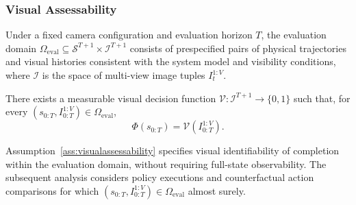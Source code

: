 \subsubsection{Visual Assessability}
Under a fixed camera configuration and evaluation horizon $T$, the evaluation domain
$\Omega_{\mathrm{eval}}\subseteq\mathcal S^{T+1}\times\mathcal I^{T+1}$
consists of prespecified pairs of physical trajectories and visual histories
consistent with the system model and visibility conditions,
where $\mathcal I$ is the space of multi-view image tuples $I_t^{1:V}$.

\begin{assumption}
\label{ass:visualassessability}
There exists a measurable visual decision function $\mathcal V:\mathcal I^{T+1}\to\{0,1\}$
such that, for every $(s_{0:T},I_{0:T}^{1:V})\in\Omega_{\mathrm{eval}}$,
\begin{equation}
 \Phi(s_{0:T})=\mathcal V(I_{0:T}^{1:V}).
 \label{eq:visassumption}
\end{equation}
\end{assumption}

Assumption~\ref{ass:visualassessability} specifies visual identifiability of completion within the evaluation domain,
without requiring full-state observability.
The subsequent analysis considers policy executions and counterfactual action comparisons
for which $(s_{0:T},I_{0:T}^{1:V})\in\Omega_{\mathrm{eval}}$ almost surely.

